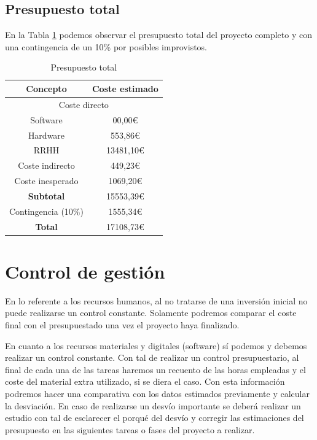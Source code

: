 \documentclass[titlepage,12pt]{report}
\begin{document}
\subsection{Presupuesto total}

En la Tabla \ref{total} podemos observar el presupuesto total del proyecto completo y con una contingencia de un 10\% por posibles improvistos.

\begin{table}[H]
	\centering
	\begin{tabular}{|c|c|}
		\hline
		\textbf{Concepto} 		& \textbf{Coste estimado} \\ \hline \hline
		\multicolumn{2}{|c|}{Coste directo}  	\\ \hline
		Software 				&     00,00€  	\\
		Hardware				&    553,86€  	\\ 
		RRHH 					&  13481,10€  	\\ \hline 
		Coste indirecto			&    449,23€  	\\ \hline
		Coste inesperado		&   1069,20€	\\ \hline		
		\textbf{Subtotal}		&  15553,39€  	\\ \hline
		Contingencia (10$\%$) 	&   1555,34€  	\\ \hline \hline
		\textbf{Total}			&  17108,73€  	\\ \hline
	\end{tabular}
	\caption{Presupuesto total}
	\label{total}
\end{table}

\section{Control de gestión}

En lo referente a los recursos humanos, al no tratarse de una inversión inicial no puede realizarse un control constante. Solamente podremos comparar el coste final con el presupuestado una vez el proyecto haya finalizado.

En cuanto a los recursos materiales y digitales (software) sí podemos y debemos realizar un control constante. Con tal de realizar un control presupuestario, al final de cada una de las tareas haremos un recuento de las horas empleadas y el coste del material extra utilizado, si se diera el caso. Con esta información podremos hacer una comparativa con los datos estimados previamente y calcular la desviación. En caso de realizarse un desvío importante se deberá realizar un estudio con tal de esclarecer el porqué del desvío y corregir las estimaciones del presupuesto en las siguientes tareas o fases del proyecto a realizar.
\end{document}
